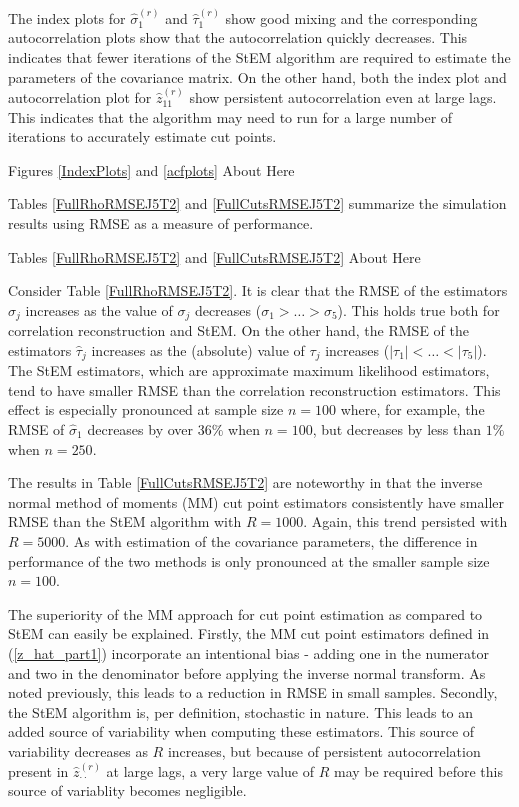 \documentclass[12pt]{article}
\begin{document}
The index plots for $\hat{\sigma}_1^{(r)}$ and $\hat{\tau}_1^{(r)}$ show good mixing and the corresponding autocorrelation plots show that the autocorrelation quickly decreases. This indicates that fewer iterations of the StEM algorithm are required to estimate the parameters of the covariance matrix. On the other hand, both the index plot and autocorrelation plot for $\hat{z}_{11}^{(r)}$ show persistent autocorrelation even at large lags. This indicates that the algorithm may need to run for a large number of iterations to accurately estimate cut points.
\bigskip
\begin{center}
	Figures \ref{IndexPlots} and \ref{acfplots} About Here
\end{center}
\bigskip
Tables \ref{FullRhoRMSEJ5T2} and \ref{FullCutsRMSEJ5T2} summarize the simulation results using RMSE as a measure of performance.
\bigskip
\begin{center}
	Tables \ref{FullRhoRMSEJ5T2} and \ref{FullCutsRMSEJ5T2} About Here
\end{center}
\bigskip
Consider Table \ref{FullRhoRMSEJ5T2}. It is clear that the RMSE of the estimators $\hat{\sigma}_j$ increases as  the value of $\sigma_j$ decreases ($\sigma_1>\ldots>\sigma_5$). This holds true both for correlation reconstruction and StEM. On the other hand, the RMSE of the estimators $\hat{\tau}_j$ increases as the (absolute) value of $\tau_j$ increases ($|\tau_1|<\ldots<|\tau_5|$). The StEM estimators, which are approximate maximum likelihood estimators, tend to have smaller RMSE than the correlation reconstruction estimators. This effect is especially pronounced at sample size $n=100$ where, for example, the RMSE of $\hat{\sigma}_1$ decreases by over $36\%$ when $n=100$, but decreases by less than $1\%$ when $n=250$. 

The results in Table \ref{FullCutsRMSEJ5T2} are noteworthy in that the inverse normal method of moments (MM) cut point estimators consistently have smaller RMSE than the StEM algorithm with $R = 1000$. Again, this trend persisted with $R=5000$. As with estimation of the covariance parameters, the difference in performance of the two methods is only pronounced at the smaller sample size $n=100$.

The superiority of the MM approach for cut point estimation as compared to StEM can easily be explained. Firstly, the MM cut point estimators defined in (\ref{z_hat_part1}) incorporate an intentional bias - adding one in the numerator and two in the denominator before applying the inverse normal transform. As noted previously, this leads to a reduction in RMSE in small samples. Secondly, the StEM algorithm is, per definition, stochastic in nature. This leads to an added source of variability when computing these estimators. This source of variability decreases as $R$ increases, but because of persistent autocorrelation present in $\hat{z}^{(r)}_{\cdot \cdot}$ at large lags, a very large value of $R$ may be required before this source of variablity becomes negligible.
\end{document}
